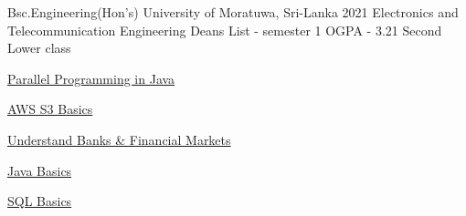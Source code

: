\documentclass[11pt]{spidercv}
\begin{document}
\begin{MainPart}
    
    \Experience
        {\ColorHighlight}
		{Bsc.Engineering(Hon's)}
		{University of Moratuwa, Sri-Lanka}
        {2021}
        {   
            Electronics and Telecommunication Engineering \newline
            Deans List - semester 1 \newline
            OGPA - 3.21  \newline
            Second Lower class
        }
    
     \begin{ItemList}{\ColorHighlight}
         \item \href{https://www.coursera.org/account/accomplishments/certificate/M9T8WEGSTHBH}{Parallel Programming in Java}
         \item \href{https://www.coursera.org/account/accomplishments/verify/PSC44VTTBY62}{AWS S3 Basics} 
         \item \href{https://www.udemy.com/certificate/UC-847f04f0-600e-44c2-b6dd-5c378ce8fe7b/} {Understand Banks & Financial Markets}
         \item \href{https://www.hackerrank.com/certificates/4a3abb1b4200}{Java Basics} 
         \item \href{https://www.hackerrank.com/certificates/4a3abb1b4200}{SQL Basics} 
    \end{ItemList}
    


    \end{MainPart}

     

    
\end{document}

